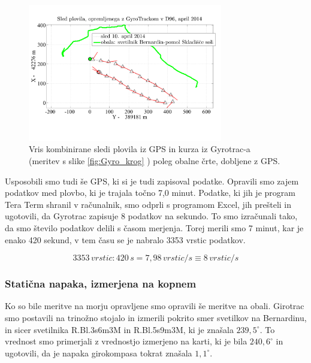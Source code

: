 \begin{figure}
	\centering
	\includegraphics[height=6cm]{Vaje/VzorecPoroc/figs/SledPlovilaZGyrotrackom_KurzSamoOdNmeaGps.pdf}
	\caption{Vris kombinirane sledi plovila iz GPS in kurza iz Gyrotrac-a (meritev s slike \ref{fig:Gyro_krog} ) poleg obalne črte, dobljene z GPS.}
	\label{fig:GyroGps_sled}       %
\end{figure}

Usposobili smo tudi še GPS, ki si je tudi zapisoval podatke. Opravili smo zajem podatkov med plovbo, ki je trajala točno 7,0 minut. Podatke, ki jih je program Tera Term shranil v računalnik, smo odprli s programom Excel, jih prešteli in ugotovili, da Gyrotrac zapisuje 8 podatkov na sekundo. To smo izračunali tako, da smo število podatkov delili s časom merjenja. Torej merili smo 7 minut, kar je enako 420 sekund, v tem času se je nabralo 3353 vrstic podatkov.

$$ 3353\,vrstic : 420\,s = 7,98\,vrstic/s \equiv 8\,vrstic/s $$


\subsubsection{Statična napaka, izmerjena na kopnem}
Ko so bile meritve na morju opravljene smo opravili še meritve na obali.  Girotrac smo postavili na trinožno stojalo in izmerili pokrito smer svetilkov na Bernardinu, in sicer svetilnika R.Bl.3s6m3M in R.Bl.5s9m3M, ki je znašala $239,5^{\circ}$. To vrednost smo primerjali z vrednostjo izmerjeno na karti, ki je bila $240,6^{\circ}$ in ugotovili, da je napaka girokompasa tokrat znašala $1,1^{\circ}$. 

